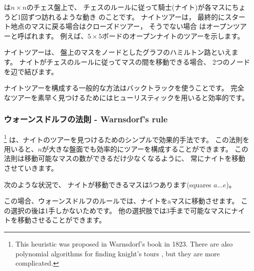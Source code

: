 は$n \times n$のチェス盤上で、
チェスのルールに従って騎士(ナイト)が各マスにちょうど1回ずつ訪れるような動き
のことです。
ナイトツアーは，
最終的にスタート地点のマスに戻る場合はクローズドツアー，
そうでない場合 はオープンツアーと呼ばれます。
例えば、$5 \times 5$ボードのオープンナイトのツアーを示します。

\begin{center}
\end{center}

ナイトツアーは、
盤上のマスをノードとしたグラフのハミルトン路といえます。
ナイトがチェスのルールに従ってマスの間を移動できる場合、
2つのノードを辺で結びます。

ナイトツアーを構成する一般的な方法はバックトラックを使うことです。
完全なツアーを素早く見つけるためにはヒューリスティックを用いると効率的です。

\subsubsection{ウォーンスドルフの法則 - Warnsdorf's rule}


\footnote{This heuristic was proposed
in Warnsdorf's book \cite{war23} in 1823. There are
also polynomial algorithms for finding knight's tours
\cite{par97}, but they are more complicated.}
は、ナイトのツアーを見つけるためのシンプルで効果的手法です。
この法則を用いると、$n$が大きな盤面でも効率的にツアーを構成することができます。
この法則は移動可能なマスの数ができるだけ少なくなるように、
常にナイトを移動させていきます。

次のような状況で、
ナイトが移動できるマスは5つあります(squares $a \ldots e$)。
\begin{center}
\end{center}

この場合、ウォーンスドルフのルールでは、ナイトをaマスに移動させます。
この選択の後は1手しかないためです。
他の選択肢では3手まで可能なマスにナイトを移動させることができます。